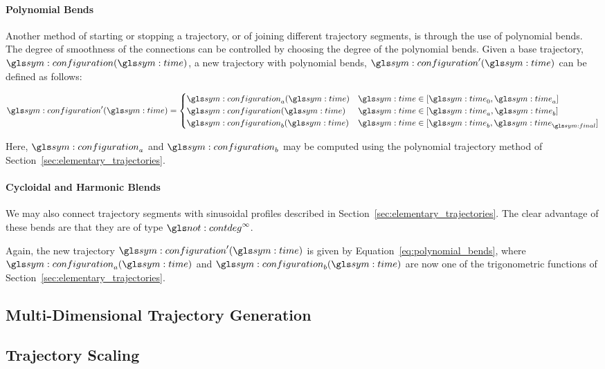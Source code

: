			\paragraph{Polynomial Bends}

				Another method of starting or stopping a trajectory, or of
				joining different trajectory segments, is through the use of
				polynomial bends. The degree of smoothness of the connections
				can be controlled by choosing the degree of the polynomial
				bends. Given a base trajectory, $\configuration(\timesym)$, a
				new trajectory with polynomial bends,
				$\configuration'(\timesym)$ can be defined as follows:

				\begin{equation}
					\configuration'(\timesym) =
					\begin{cases}
						\configuration_a(\timesym) & \timesym \in [\timesym_0, \timesym_a] \\
						\configuration(\timesym) & \timesym \in [\timesym_a, \timesym_b] \\
						\configuration_b(\timesym) & \timesym \in [\timesym_b, \timesym_{\final}] \\
					\end{cases}
					\label{eq:polynomial_bends}
				\end{equation}

				Here, $\configuration_a$ and $\configuration_b$ may be computed
				using the polynomial trajectory method of
				Section~\ref{sec:elementary_trajectories}.



			\paragraph{Cycloidal and Harmonic Blends}

				We may also connect trajectory segments with sinusoidal
				profiles described in Section~\ref{sec:elementary_trajectories}.
				The clear advantage of these bends are that they are of type
				$\contdeg{\infty}$.

				Again, the new trajectory $\configuration'(\timesym)$ is given
				by Equation~\ref{eq:polynomial_bends}, where
				$\configuration_a(\timesym)$ and $\configuration_b(\timesym)$
				are now one of the trigonometric functions of
				Section~\ref{sec:elementary_trajectories}.

	\subsection{Multi-Dimensional Trajectory Generation}%
	\label{sec:multi_dimensional_trajectory_generation}


	\subsection{Trajectory Scaling}%
	\label{sec:trajectory_scaling}

